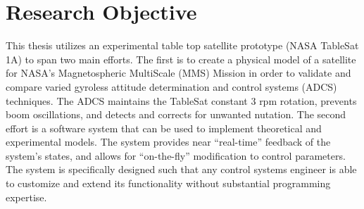 











\section{Research Objective}
\label{sec:ResearchObjective}

This thesis utilizes an experimental table top satellite prototype (NASA TableSat 1A) to span two main efforts.  The first is to create a physical model of a satellite for NASA's Magnetospheric MultiScale (MMS) Mission in order to validate and compare varied gyroless attitude determination and control systems (ADCS) techniques.  The ADCS maintains the TableSat constant 3 rpm rotation, prevents boom oscillations, and detects and corrects for unwanted nutation.  The second effort is a software system that can be used to implement theoretical and experimental models.  The system provides near ``real-time'' feedback of the system's states, and allows for ``on-the-fly'' modification to control parameters.  The system is specifically designed such that any control systems engineer is able to customize and extend its functionality without substantial programming expertise.

